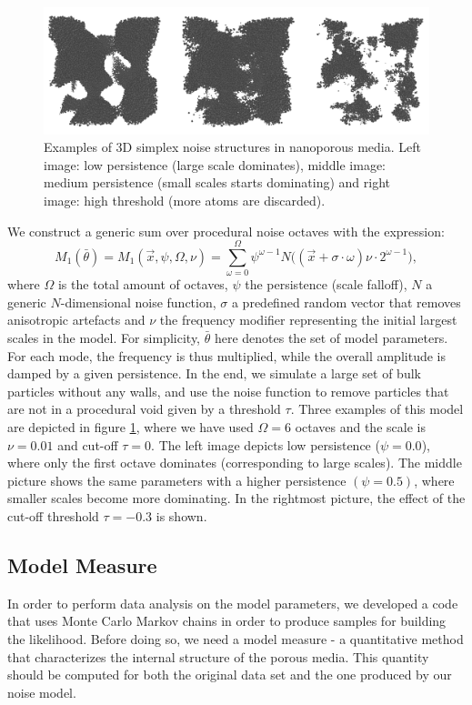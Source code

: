 \documentclass[aps,pre,twocolumn,letterpaper,floatfix,showpacs]{revtex4}
\begin{document}
\begin{figure}
\includegraphics[width=.95\textwidth]{model_examples.png}
\caption{Examples of 3D simplex noise structures in nanoporous media. Left image: low persistence (large scale dominates), middle image: medium persistence (small scales starts dominating) and right image: high threshold (more atoms are discarded). }
\label{fig:model_example}
\end{figure}
We construct a generic sum over procedural noise octaves with the expression: 
\begin{equation}
  M_1(\bar \theta) = M_1(\vec x, \psi, \Omega, \nu) = \sum_{\omega=0}^{\Omega} \psi^{\omega -1}   N\big((\vec x + \sigma \cdot \omega)\nu \cdot 2^{\omega-1} \big),
\label{eq:noisemodel1}
\end{equation}
where $\Omega$ is the total amount of octaves, $\psi$ the persistence (scale falloff), $N$ a generic $N$-dimensional noise function, $\sigma$ a predefined random vector that removes anisotropic artefacts and $\nu$ the frequency modifier representing the initial largest scales in the model. For simplicity, $\bar \theta$ here denotes the set of model parameters. For each mode, the frequency is thus multiplied, while the overall amplitude is damped by a given persistence. In the end, we simulate a large set of bulk particles without any walls, and use the noise function to remove particles that are not in a procedural void given by a threshold $\tau$. Three examples of this model are depicted in figure \ref{fig:model_example}, where we have used $\Omega=6$ octaves and the scale is $\nu=0.01$ and cut-off $\tau=0$. The left image depicts low persistence ($\psi = 0.0$), where only the first octave dominates (corresponding to large scales). The middle picture shows the same parameters with a higher persistence $(\psi = 0.5)$, where smaller scales become more dominating. In the rightmost picture, the effect of the cut-off threshold $\tau = -0.3$ is shown.   


\subsection{Model Measure}
In order to perform data analysis on the model parameters, we developed a code that uses Monte Carlo Markov chains in order to produce samples for building the likelihood. Before doing so, we need a model measure - a quantitative method that characterizes the internal structure of the porous media. This quantity should be computed for both the original data set and the one produced by our noise model. 
\end{document}
